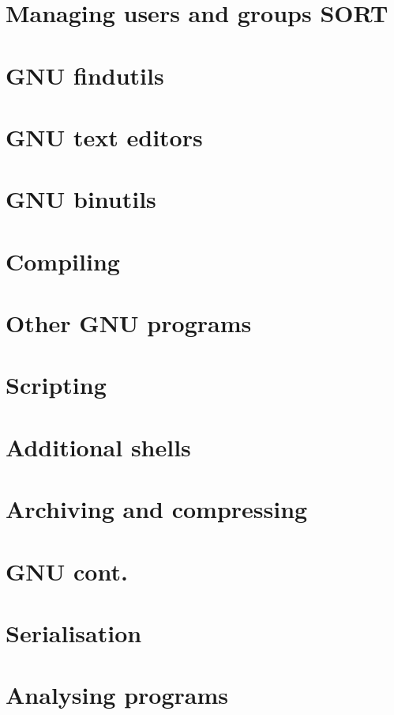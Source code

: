 \documentclass[oneside]{book}
\begin{document}
\part{Managing users and groups SORT}



\part{GNU findutils}


\part{GNU text editors}



\part{GNU binutils}

\part{Compiling}







\part{Other GNU programs}





\part{Scripting}





\part{Additional shells}









\part{Archiving and compressing}




\part{GNU cont.}


\part{Serialisation}





\part{Analysing programs}





\end{document}
